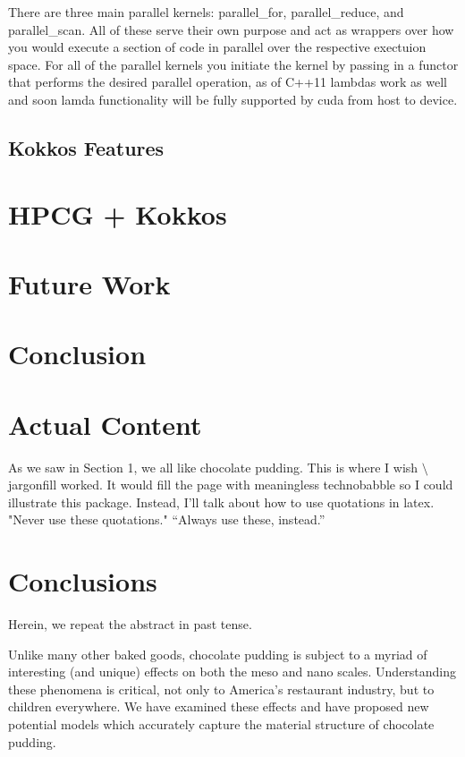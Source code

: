 \documentclass{ccr15}
\begin{document}
There are three main parallel kernels: parallel_for, parallel_reduce, and parallel_scan. All of
these serve their own purpose and act as wrappers over how you would execute a section of code in
parallel over the respective exectuion space. For all of the parallel kernels you initiate the
kernel by passing in a functor that performs the desired parallel operation, as of C++11 lambdas
work as well and soon lamda functionality will be fully supported by cuda from host to device.

\subsection{Kokkos Features}

\section{HPCG + Kokkos}

\section{Future Work}

\section{Conclusion}

\section{Actual Content}

As we saw in Section 1, we all like chocolate pudding. This is where I wish
\textsf{$\setminus$jargonfill} worked. It would fill the page with meaningless technobabble so I could illustrate this
package. Instead, I'll talk about how to use quotations in latex. "Never use these quotations." ``Always use these,
instead.''

\section{Conclusions}
Herein, we repeat the abstract in past tense.

Unlike many other baked goods, chocolate pudding is subject to a myriad of interesting (and unique) effects on both the
meso and nano scales.  Understanding these phenomena is critical, not only to America's restaurant industry, but to
children everywhere.  We have examined these effects and have proposed new potential models which accurately capture
the material structure of chocolate pudding.


\nocite{ZAB:Mentor05}


%
\end{document}
